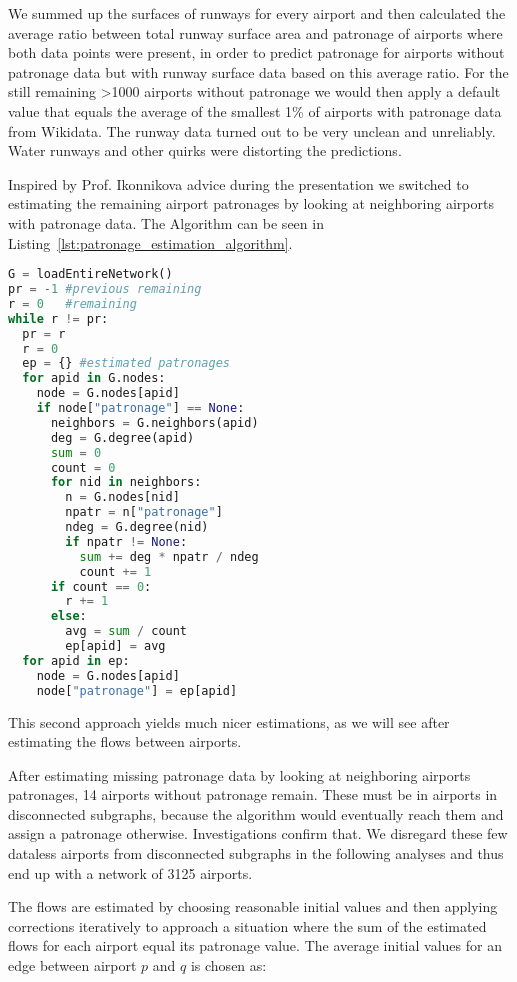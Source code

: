 \documentclass[twocolumn]{tum-article}
\begin{document}
We summed up the surfaces of runways for every airport and then calculated the average ratio between total runway surface area and patronage of airports where both data points were present, in order to predict patronage for airports without patronage data but with runway surface data based on this average ratio. For the still remaining >1000 airports without patronage we would then apply a default value that equals the average of the smallest 1\% of airports with patronage data from Wikidata. 
The runway data turned out to be very unclean and unreliably. Water runways and other quirks were distorting the predictions. 

Inspired by Prof. Ikonnikova advice during the presentation we switched to estimating the remaining airport patronages by looking at neighboring airports with patronage data. The Algorithm can be seen in Listing~\ref{lst:patronage_estimation_algorithm}.
\begin{lstlisting}[language=Python, caption={Patronage estimation algorithm, that using neighboring airport's patronage data}, label=lst:patronage_estimation_algorithm]
G = loadEntireNetwork()
pr = -1 #previous remaining
r = 0   #remaining
while r != pr:
  pr = r
  r = 0
  ep = {} #estimated patronages
  for apid in G.nodes:
    node = G.nodes[apid]
    if node["patronage"] == None:
      neighbors = G.neighbors(apid) 
      deg = G.degree(apid)
      sum = 0
      count = 0
      for nid in neighbors: 
        n = G.nodes[nid]
        npatr = n["patronage"]
        ndeg = G.degree(nid) 
        if npatr != None: 
          sum += deg * npatr / ndeg
          count += 1
      if count == 0:
        r += 1
      else:
        avg = sum / count
        ep[apid] = avg 
  for apid in ep: 
    node = G.nodes[apid]
    node["patronage"] = ep[apid]
\end{lstlisting}
This second approach yields much nicer estimations, as we will see after estimating the flows between airports. 

After estimating missing patronage data by looking at neighboring airports patronages, 14 airports without patronage remain. These must be in airports in disconnected subgraphs, because the algorithm would eventually reach them and assign a patronage otherwise. Investigations confirm that. We disregard these few dataless airports from disconnected subgraphs in the following analyses and thus end up with a network of 3125 airports. 

The flows are estimated by choosing reasonable initial values and then applying corrections iteratively to approach a situation where the sum of the estimated flows for each airport equal its patronage value.
The average initial values for an edge between airport $p$ and $q$ is chosen as: 
\end{document}
